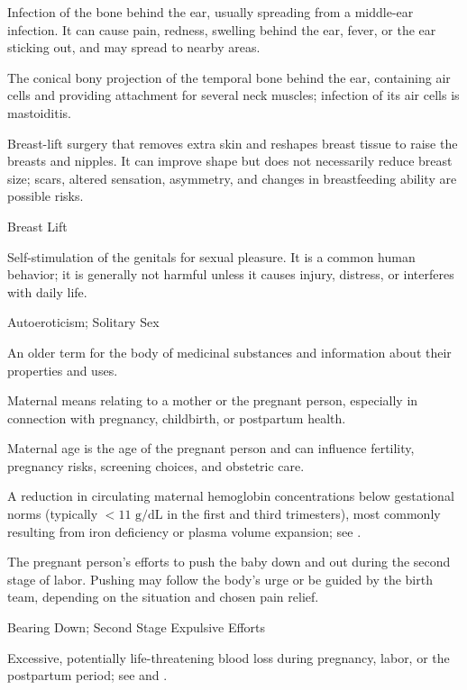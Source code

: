  Infection of the bone behind the ear, usually spreading from a middle-ear infection. It can cause pain, redness, swelling behind the ear, fever, or the ear sticking out, and may spread to nearby areas.

 The conical bony projection of the temporal bone behind the ear, containing air cells and providing attachment for several neck muscles; infection of its air cells is mastoiditis.

 Breast-lift surgery that removes extra skin and reshapes breast tissue to raise the breasts and nipples. It can improve shape but does not necessarily reduce breast size; scars, altered sensation, asymmetry, and changes in breastfeeding ability are possible risks.

\synonyms
Breast Lift

 Self-stimulation of the genitals for sexual pleasure. It is a common human behavior; it is generally
not harmful unless it causes injury, distress, or interferes with daily life.

\synonyms
Autoeroticism; Solitary Sex

 An older term for the body of medicinal substances and information about their properties and uses.

 Maternal means relating to a mother or the pregnant person, especially in connection with pregnancy, childbirth, or postpartum health.

 Maternal age is the age of the pregnant person and can influence fertility, pregnancy risks, screening choices, and obstetric care.

 A reduction in circulating maternal hemoglobin concentrations below gestational norms (typically $<11\text{ g/dL}$ in the first and third trimesters), most commonly resulting from iron deficiency or plasma volume expansion; see .

 The pregnant person's efforts to push the baby down and out during the second stage of labor. Pushing may follow the body's urge or be guided by the birth team, depending on the situation and chosen pain relief.

\synonyms
Bearing Down; Second Stage Expulsive Efforts

 Excessive, potentially life-threatening blood loss during pregnancy, labor, or the postpartum period; see  and .

